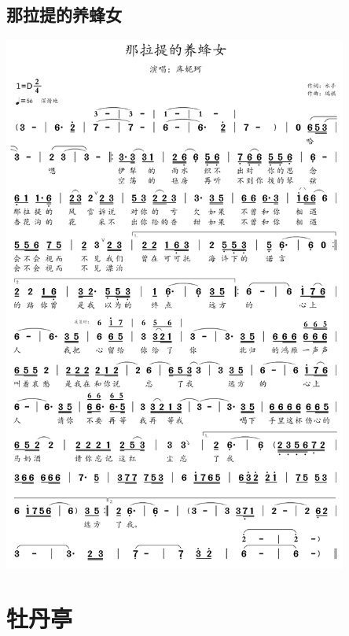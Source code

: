 \documentclass[cn,pad,twocol]{elegantbook}
\begin{document}
\section{那拉提的养蜂女} \includegraphics[width=0.85\textwidth]{macos/20210208那拉提的养蜂女.png}

\chapter{牡丹亭}
\end{document}
